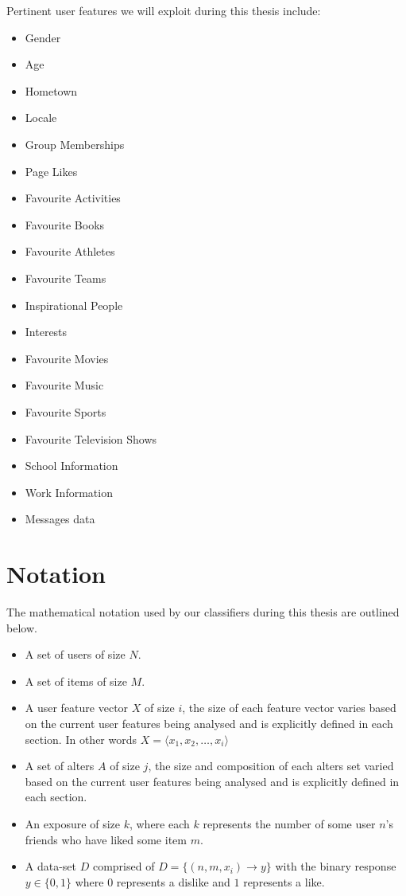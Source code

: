 \clearpage

Pertinent user features we will exploit during this thesis include:
\begin{itemize}
\item Gender
\item Age
\item Hometown
\item Locale
\item Group Memberships
\item Page Likes
\item Favourite Activities
\item Favourite Books
\item Favourite Athletes
\item Favourite Teams
\item Inspirational People
\item Interests
\item Favourite Movies
\item Favourite Music
\item Favourite Sports
\item Favourite Television Shows
\item School Information
\item Work Information
\item Messages data
\end{itemize}

\section{Notation}
\label{sec:notation}

The mathematical notation used by our classifiers during this thesis are outlined below.

\begin{itemize}
\item A set of users of size $N$. 
\item A set of items of size $M$.
\item A user feature vector $X$ of size $i$, the size of each feature vector varies based on the current user features being analysed
and is explicitly defined in each section. In other words $X = \langle x_1, x_2, \dots , x_i \rangle$
\item A set of alters $A$ of size $j$, the size and composition of each alters set varied based on the current user features being 
analysed and is explicitly defined in each section.
\item An exposure of size $k$, where each $k$ represents the number of some user $n$'s friends who have liked some item $m$.
\item A data-set $D$ comprised of $D = \{(n,m,x_i) \to y\}$ with the binary response $y \in \{0,1\}$ where $0$ represents a dislike 
and $1$ represents a like.
\end{itemize}


